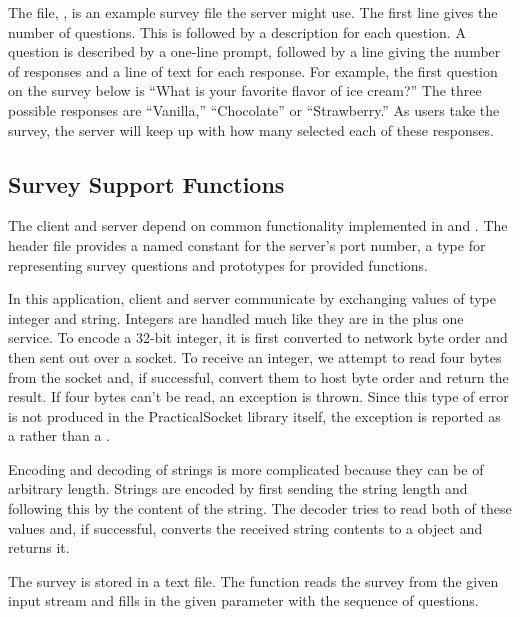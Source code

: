 The file, , is an example survey file the server
might use.  The first line gives the number of questions.  This is
followed by a description for each question.  A question is described
by a one-line prompt, followed by a line giving the number of
responses and a line of text for each response.  For example, the
first question on the survey below is ``What is your favorite flavor
of ice cream?''  The three possible responses are ``Vanilla,''
``Chocolate'' or ``Strawberry.''  As users take the survey, the server
will keep up with how many selected each of these responses.


\subsection{Survey Support Functions}

The client and server depend on common functionality implemented in
 and .  The header file
provides a named constant for the server's port number, a
 type for representing survey questions and prototypes
for provided functions.



\begin{topcode}


In this application, client and server communicate by exchanging
values of type integer and string.  Integers are handled much like
they are in the plus one service.  To encode a 32-bit integer, it is
first converted to network byte order and then sent out over a socket.
To receive an integer, we attempt to read four bytes from the socket
and, if successful, convert them to host byte order and return the
result.  If four bytes can't be read, an exception is thrown.  Since
this type of error is not produced in the PracticalSocket library
itself, the exception is reported as a  rather
than a .


Encoding and decoding of strings is more complicated because they can
be of arbitrary length.  Strings are encoded by first sending the
string length and following this by the content of the string.  The
decoder tries to read both of these values and, if successful,
converts the received string contents to a  object and
returns it.


The survey is stored in a text file.  The  function
reads the survey from the given input stream and fills in the given
 parameter with the sequence of questions.

\end{topcode}

